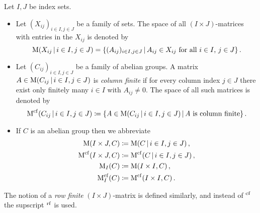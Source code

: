 \begin{definition}
  \label{definition: infinite matrices}
  Let $I, J$ be index sets.
  \begin{itemize}
    \item
      Let $(X_{ij})_{i \in I, j \in J}$ be a family of sets.
      The space of all $(I \times J)$-matrices with entries in the $X_{ij}$ is denoted by
      \[
          \Mat( X_{ij} \suchthat i \in I, j \in J)
        = \{
            (A_{ij})_{i \in I, j \in J}
          \suchthat
            \text{$A_{ij} \in X_{ij}$ for all $i \in I$, $j \in J$}
          \} \,.
      \]
    \item
      Let $(C_{ij})_{i \in I, j \in J}$ be a family of abelian groups.
      A matrix $A \in \Mat( C_{ij} \suchthat i \in I, j \in J)$ is \emph{column finite} if for every column index $j \in J$ there exist only finitely many $i \in I$ with $A_{ij} \neq 0$.
      The space of all such matrices is denoted by
      \[
                  \Mat^{\cf}( C_{ij} \suchthat i \in I, j \in J )
        \defined  \left\{
                    A \in \Mat( C_{ij} \suchthat i \in I, j \in J )
                  \suchthat*
                    \text{$A$ is column finite}
                  \right\}.
      \]
    \item
      If $C$ is an abelian group then we abbreviate
      \begin{align*}
                  \Mat(I \times J, C)
        &\defined \Mat( C \suchthat i \in I, j \in J ) \,,  
        \\
                  \Mat^{\cf}(I \times J, C)
        &\defined \Mat^{\cf}( C \suchthat i \in I, j \in J ) \,,
        \\
                  \Mat_I(C)
        &\defined \Mat(I \times I, C) \,,
        \\
                  \Mat^{\cf}_I(C)
        &\defined \Mat^{\cf}(I \times I, C) \,.
      \end{align*}
  \end{itemize}
  The notion of a \emph{row finite} $(I \times J)$-matrix is defined similarly, and instead of ${}^{\operatorname{cf}}$ the supscript ${}^{\operatorname{rf}}$ is used.
\end{definition}


